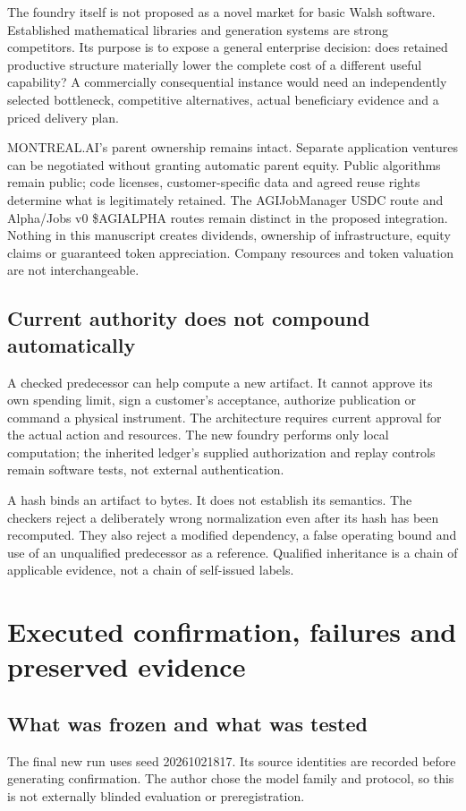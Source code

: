 \documentclass[11pt,letterpaper]{article}
\theoremstyle{definition}\newtheorem{definition}[theorem]{Definition}
\theoremstyle{remark}\newtheorem{remark}[theorem]{Remark}
\begin{document}
The foundry itself is not proposed as a novel market for basic Walsh software. Established mathematical libraries and generation systems are strong competitors. Its purpose is to expose a general enterprise decision: does retained productive structure materially lower the complete cost of a different useful capability? A commercially consequential instance would need an independently selected bottleneck, competitive alternatives, actual beneficiary evidence and a priced delivery plan.

MONTREAL.AI's parent ownership remains intact. Separate application ventures can be negotiated without granting automatic parent equity. Public algorithms remain public; code licenses, customer-specific data and agreed reuse rights determine what is legitimately retained. The AGIJobManager USDC route and Alpha/Jobs v0 \$AGIALPHA routes remain distinct in the proposed integration. Nothing in this manuscript creates dividends, ownership of infrastructure, equity claims or guaranteed token appreciation. Company resources and token valuation are not interchangeable.

\subsection{Current authority does not compound automatically}
A checked predecessor can help compute a new artifact. It cannot approve its own spending limit, sign a customer's acceptance, authorize publication or command a physical instrument. The architecture requires current approval for the actual action and resources. The new foundry performs only local computation; the inherited ledger's supplied authorization and replay controls remain software tests, not external authentication.

A hash binds an artifact to bytes. It does not establish its semantics. The checkers reject a deliberately wrong normalization even after its hash has been recomputed. They also reject a modified dependency, a false operating bound and use of an unqualified predecessor as a reference. Qualified inheritance is a chain of applicable evidence, not a chain of self-issued labels.

\section{Executed confirmation, failures and preserved evidence}
\subsection{What was frozen and what was tested}
The final new run uses seed 20261021817. Its source identities are recorded before generating confirmation. The author chose the model family and protocol, so this is not externally blinded evaluation or preregistration.
\end{document}

